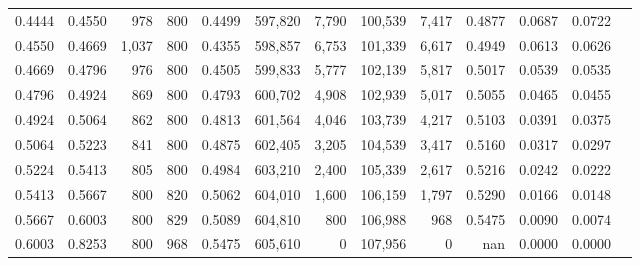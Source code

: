 \begin{tabular}{rrrrrrrrrrrrr}
0.4444 & 0.4550 &    978 & 800 &                                     0.4499 & 597,820 &   7,790 & 100,539 &   7,417 & 0.4877 & 0.0687 & 0.0722 \\
0.4550 & 0.4669 &  1,037 & 800 &                                     0.4355 & 598,857 &   6,753 & 101,339 &   6,617 & 0.4949 & 0.0613 & 0.0626 \\
0.4669 & 0.4796 &    976 & 800 &                                     0.4505 & 599,833 &   5,777 & 102,139 &   5,817 & 0.5017 & 0.0539 & 0.0535 \\
0.4796 & 0.4924 &    869 & 800 &                                     0.4793 & 600,702 &   4,908 & 102,939 &   5,017 & 0.5055 & 0.0465 & 0.0455 \\
0.4924 & 0.5064 &    862 & 800 &                                     0.4813 & 601,564 &   4,046 & 103,739 &   4,217 & 0.5103 & 0.0391 & 0.0375 \\
0.5064 & 0.5223 &    841 & 800 &                                     0.4875 & 602,405 &   3,205 & 104,539 &   3,417 & 0.5160 & 0.0317 & 0.0297 \\
0.5224 & 0.5413 &    805 & 800 &                                     0.4984 & 603,210 &   2,400 & 105,339 &   2,617 & 0.5216 & 0.0242 & 0.0222 \\
0.5413 & 0.5667 &    800 & 820 &                                     0.5062 & 604,010 &   1,600 & 106,159 &   1,797 & 0.5290 & 0.0166 & 0.0148 \\
0.5667 & 0.6003 &    800 & 829 &                                     0.5089 & 604,810 &     800 & 106,988 &     968 & 0.5475 & 0.0090 & 0.0074 \\
0.6003 & 0.8253 &    800 & 968 &                                     0.5475 & 605,610 &       0 & 107,956 &       0 &    nan & 0.0000 & 0.0000 \\
\bottomrule
\end{tabular}
